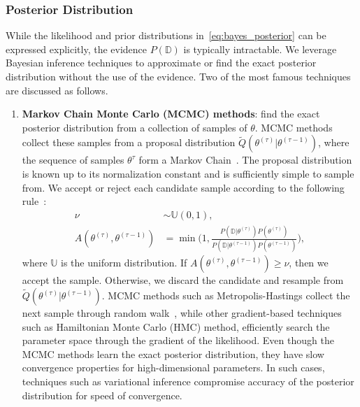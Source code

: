 \subsubsection{Posterior Distribution}

While the likelihood and prior distributions in~\eqref{eq:bayes_posterior} can
be expressed explicitly, the evidence $P(\mathbb{D})$ is typically intractable.
We leverage Bayesian inference techniques to approximate or find the exact
posterior distribution without the use of the evidence. Two of the most famous
techniques are discussed as follows.
\begin{enumerate}
  \item \textbf{Markov Chain Monte Carlo (MCMC) methods}: find the exact
  posterior distribution from a collection of samples of $\theta$.
  MCMC methods collect these samples from a proposal distribution
  $\tilde{Q}(\theta^{(\tau)} | \theta^{(\tau-1)})$, where the sequence of
  samples $\theta^\tau$ form a Markov Chain~\cite{bishop2006pattern}.
  The proposal distribution is known up to its normalization constant and is
  sufficiently simple to sample from. 
  We accept or reject each candidate sample according to the following rule~\cite{bishop2006pattern}:
  \begin{align*}
    \nu &\sim \mathbb{U}(0, 1), \\
    A(\theta^{(\tau)}, \theta^{(\tau-1)}) &= \min \Biggl(1, \frac{P(\mathbb{D} | \theta^{(\tau)})P(\theta^{(\tau)})}{P(\mathbb{D} | \theta^{(\tau-1)})P(\theta^{(\tau-1)})} \Biggr),
  \end{align*}
  \noindent where $\mathbb{U}$ is the uniform distribution. If
  $A(\theta^{(\tau)}, \theta^{(\tau-1)}) \geq \nu$, then we accept the sample. 
  Otherwise, we discard the candidate and resample from $\tilde{Q}(\theta^{(\tau)} |
  \theta^{(\tau-1)})$.
  MCMC methods such as Metropolis-Hastings collect the next sample through
  random walk~\cite{gilks1995markov}, while other gradient-based techniques such
  as Hamiltonian Monte Carlo (HMC) method, efficiently search the
  parameter space through the gradient of the likelihood.
  Even though the MCMC methods learn the exact posterior distribution, they have
  slow convergence properties for high-dimensional parameters. In such cases,
  techniques such as variational inference compromise accuracy of the posterior
  distribution for speed of convergence.
  

\end{enumerate}
